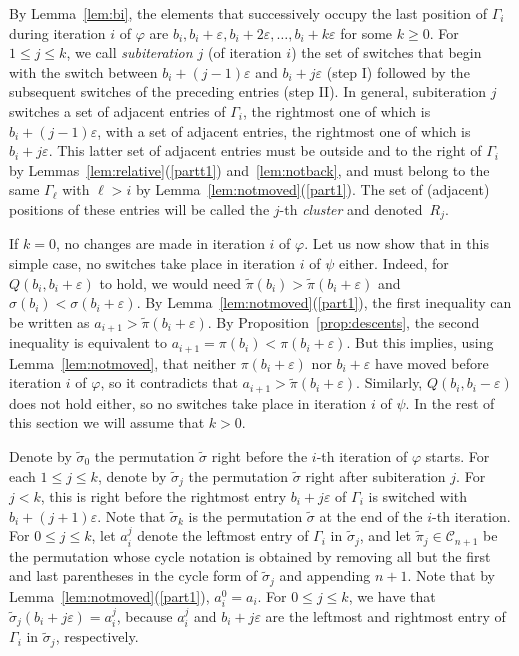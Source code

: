 \documentclass[11pt]{amsart}
\newcommand\C{\mathcal C}
\newcommand\wt{\widetilde}
\newcommand\bij{\varphi}
\newcommand\inv{\psi}
\newcommand\eps{\varepsilon}
\newcommand\sigm{\wt\sigma}
\newcommand\pim{\wt\pi}
\begin{document}
By Lemma~\ref{lem:bi}, the elements that successively occupy the last position of $\Gamma_i$ during iteration $i$ of $\bij$ are $b_i,b_i+\eps,b_i+2\eps,\dots,b_i+k\eps$ for some $k\ge0$.
For $1\le j\le k$, we call {\it subiteration $j$} (of iteration $i$) the set of switches that begin with
the switch between $b_i+(j{-}1)\eps$ and $b_i+j\eps$ (step I) followed by the subsequent switches of the preceding entries (step II).
In general, subiteration $j$ switches a set of adjacent entries of $\Gamma_i$, the rightmost one of which is $b_i+(j{-}1)\eps$,
with a set of adjacent entries, the rightmost one of which is $b_i+j\eps$.
This latter set of adjacent entries must be outside and to the right of $\Gamma_i$ by Lemmas~\ref{lem:relative}(\ref{partt1}) and~\ref{lem:notback}, and must
belong to the same $\Gamma_\ell$ with $\ell>i$ by Lemma~\ref{lem:notmoved}(\ref{part1}).
The set of (adjacent) positions of these entries will be called the $j$-th {\em cluster} and denoted~$R_j$.

If $k=0$, no changes are made in iteration $i$ of $\bij$. Let us now show that in this simple case, no switches take place in iteration $i$ of $\inv$ either.
Indeed, for $Q(b_i,b_i+\eps)$ to hold, we would need $\pim(b_i)>\pim(b_i+\eps)$ and $\sigma(b_i)<\sigma(b_i+\eps)$.
By Lemma~\ref{lem:notmoved}(\ref{part1}), the first inequality can be written as $a_{i+1}>\pim(b_i+\eps)$. By Proposition~\ref{prop:descents}, the second inequality is equivalent to
$a_{i+1}=\pi(b_i)<\pi(b_i+\eps)$. But this implies, using Lemma~\ref{lem:notmoved}, that neither $\pi(b_i+\eps)$ nor $b_i+\eps$ have moved before iteration $i$ of $\bij$, so it contradicts that $a_{i+1}>\pim(b_i+\eps)$.
Similarly, $Q(b_i,b_i-\eps)$ does not hold either, so no switches take place in iteration $i$ of $\inv$.
In the rest of this section we will assume that $k>0$.

Denote by $\sigm_0$ the permutation $\sigm$ right before the $i$-th iteration of $\bij$ starts.
For each $1\le j\le k$, denote by $\sigm_j$ the permutation $\sigm$ right after subiteration $j$. For $j<k$,
this is right before the rightmost entry $b_i+j\eps$ of $\Gamma_i$ is switched with $b_i+(j{+}1)\eps$.
Note that $\sigm_k$ is the permutation $\sigm$ at the end of the $i$-th iteration.
For $0\le j\le k$, let $a_i^j$ denote the leftmost entry of $\Gamma_i$ in $\sigm_j$, and let
$\pim_j\in\C_{n+1}$ be the permutation whose cycle notation is obtained by removing
all but the first and last parentheses in the cycle form of $\sigm_j$ and appending $n+1$.
Note that by Lemma~\ref{lem:notmoved}(\ref{part1}), $a_i^0=a_i$. For $0\le j\le k$, we have that $\sigm_j(b_i+j\eps)=a_i^j$, because
$a_i^j$ and $b_i+j\eps$ are the leftmost and rightmost entry of $\Gamma_i$ in $\sigm_j$, respectively.
\end{document}
